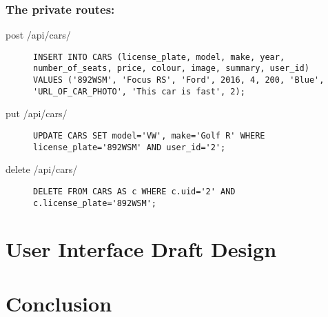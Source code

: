 \documentclass{article}
\begin{document}
\subsubsection{The private routes:}
\begin{description}
\item[post /api/cars/] \mbox{}
\begin{lstlisting}
INSERT INTO CARS (license_plate, model, make, year, number_of_seats, price, colour, image, summary, user_id)
VALUES ('892WSM', 'Focus RS', 'Ford', 2016, 4, 200, 'Blue', 'URL_OF_CAR_PHOTO', 'This car is fast', 2);
\end{lstlisting}
\item[put /api/cars/] \mbox{}
\begin{lstlisting}
UPDATE CARS SET model='VW', make='Golf R' WHERE license_plate='892WSM' AND user_id='2';
\end{lstlisting}
\item[delete /api/cars/] \mbox{}
\begin{lstlisting}
DELETE FROM CARS AS c WHERE c.uid='2' AND c.license_plate='892WSM';
\end{lstlisting}
\end{description}

\section{User Interface Draft Design} %

\section{Conclusion}
\end{document}
